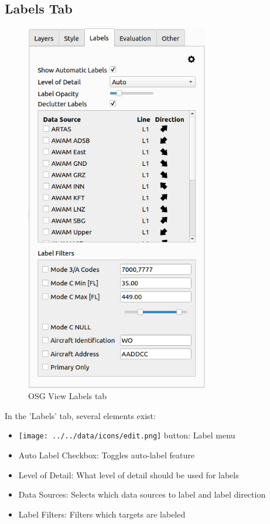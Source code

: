 \subsection{Labels Tab}
\label{sec:osgview_labels_tab} 
 
\begin{figure}[H]
   \center
    \includegraphics[width=8cm,frame]{figures/osgview_labels_tab.png}
  \caption{OSG View Labels tab}
\end{figure}

In the 'Labels' tab, several elements exist:

\begin{itemize}
 \item \texttt{[image: ../../data/icons/edit.png]} button: Label menu 
 \item Auto Label Checkbox: Toggles auto-label feature
 \item Level of Detail: What level of detail should be used for labels
 \item Data Sources: Selects which data sources to label and label direction
 \item Label Filters: Filters which targets are labeled
\end{itemize} 
\ \\

